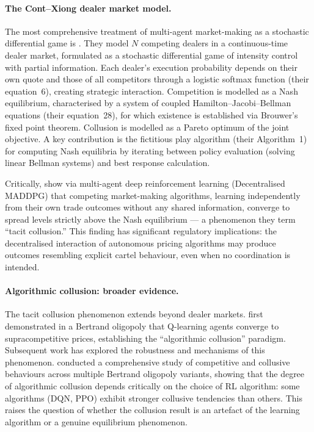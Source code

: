 \paragraph{The Cont--Xiong dealer market model.}
The most comprehensive treatment of multi-agent market-making as a
stochastic differential game is \citet{cont2024}.  They model $N$
competing dealers in a continuous-time dealer market, formulated as
a stochastic differential game of intensity control with partial
information.  Each dealer's execution probability depends on their
own quote and those of all competitors through a logistic softmax
function (their equation~6), creating strategic interaction.
Competition is modelled as a Nash equilibrium, characterised by a
system of coupled Hamilton--Jacobi--Bellman equations (their
equation~28), for which existence is established via Brouwer's fixed
point theorem.  Collusion is modelled as a Pareto optimum of the
joint objective.  A key contribution is the fictitious play algorithm
(their Algorithm~1) for computing Nash equilibria by iterating
between policy evaluation (solving linear Bellman systems) and best
response calculation.

Critically, \citet{cont2024} show via multi-agent deep reinforcement
learning (Decentralised MADDPG) that competing market-making
algorithms, learning independently from their own trade outcomes
without any shared information, converge to spread levels strictly
above the Nash equilibrium --- a phenomenon they term ``tacit
collusion.''  This finding has significant regulatory implications:
the decentralised interaction of autonomous pricing algorithms may
produce outcomes resembling explicit cartel behaviour, even when no
coordination is intended.

\paragraph{Algorithmic collusion: broader evidence.}
The tacit collusion phenomenon extends beyond dealer markets.
\citet{calvano2020} first demonstrated in a Bertrand oligopoly that
Q-learning agents converge to supracompetitive prices, establishing
the ``algorithmic collusion'' paradigm.  Subsequent work has explored
the robustness and mechanisms of this phenomenon.
\citet{deng2025} conducted a comprehensive study of competitive and
collusive behaviours across multiple Bertrand oligopoly variants,
showing that the degree of algorithmic collusion depends critically
on the choice of RL algorithm: some algorithms (DQN, PPO) exhibit
stronger collusive tendencies than others.  This raises the question
of whether the collusion result is an artefact of the learning
algorithm or a genuine equilibrium phenomenon.

